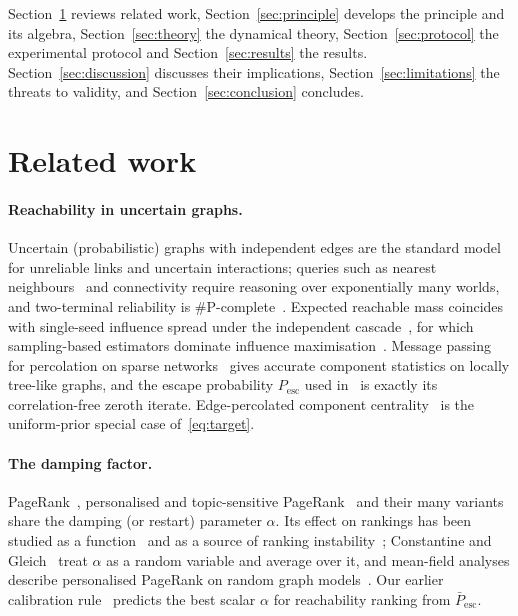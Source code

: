 \documentclass[11pt,a4paper]{article}
\theoremstyle{definition}
\theoremstyle{plain}
\newcommand{\Pesc}{P_{\mathrm{esc}}}
\newcommand{\Pescbar}{\bar{P}_{\mathrm{esc}}}
\begin{document}
Section~\ref{sec:related} reviews related work, Section~\ref{sec:principle} develops the principle and its algebra, Section~\ref{sec:theory} the dynamical theory, Section~\ref{sec:protocol} the experimental protocol and Section~\ref{sec:results} the results. Section~\ref{sec:discussion} discusses their implications, Section~\ref{sec:limitations} the threats to validity, and Section~\ref{sec:conclusion} concludes.

\section{Related work}\label{sec:related}

\paragraph{Reachability in uncertain graphs.} Uncertain (probabilistic) graphs with independent edges are the standard model for unreliable links and uncertain interactions; queries such as nearest neighbours~\cite{potamias10} and connectivity require reasoning over exponentially many worlds, and two-terminal reliability is \#P-complete~\cite{provanball83}. Expected reachable mass coincides with single-seed influence spread under the independent cascade~\cite{kkt03}, for which sampling-based estimators dominate influence maximisation~\cite{borgs14,tim14}. Message passing for percolation on sparse networks~\cite{knz14,newman23} gives accurate component statistics on locally tree-like graphs, and the escape probability $\Pesc$ used in~\cite{konstantellos26} is exactly its correlation-free zeroth iterate. Edge-percolated component centrality~\cite{hubba08,cytohubba14} is the uniform-prior special case of~\eqref{eq:target}.

\paragraph{The damping factor.} PageRank~\cite{pagerank99}, personalised and topic-sensitive PageRank~\cite{jeh03,haveliwala03} and their many variants~\cite{gleich15} share the damping (or restart) parameter $\alpha$. Its effect on rankings has been studied as a function~\cite{boldi05} and as a source of ranking instability~\cite{bressan10}; Constantine and Gleich~\cite{constantine10} treat $\alpha$ as a random variable and average over it, and mean-field analyses describe personalised PageRank on random graph models~\cite{avrachenkov18}. Our earlier calibration rule~\cite{konstantellos26} predicts the best scalar $\alpha$ for reachability ranking from $\Pescbar$.
\end{document}
